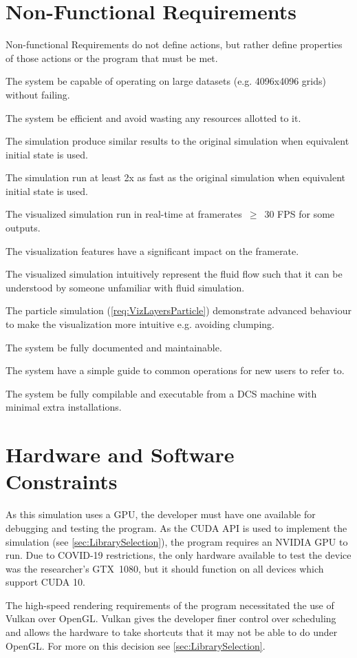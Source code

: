 \section{Non-Functional Requirements}
Non-functional Requirements do not define actions, but rather define properties of those actions or the program that must be met.
\begin{reqNF}
    \item \label{reqN:LargeData} The system \must{} be capable of operating on large datasets (e.g. 4096x4096 grids) without failing.
    \item \label{reqN:Resources} The system \must{} be efficient and avoid wasting any resources allotted to it.
    \item \label{reqN:SimilarOutput} The simulation \must{} produce similar results to the original simulation when equivalent initial state is used.
    \item \label{reqN:SimSpeed} The simulation \should{} run at least 2x as fast as the original simulation when equivalent initial state is used.
    \item \label{reqN:Realtime} The visualized simulation \must{} run in real-time at framerates~$\ge$~30 FPS for some outputs.
    \item \label{reqN:VizSpeed} The visualization features \shouldnt{} have a significant impact on the framerate.
    \item \label{reqN:Intuitive} The visualized simulation \should{} intuitively represent the fluid flow such that it can be understood by someone unfamiliar with fluid simulation.
    \item \label{reqN:VizParticleAdvanced} The particle simulation (\cref{req:VizLayersParticle}) \should{} demonstrate advanced behaviour to make the visualization more intuitive e.g. avoiding clumping.
    \item \label{reqN:Documented} The system \must{} be fully documented and maintainable. %
    \item \label{reqN:UsageGuide} The system \should{} have a simple guide to common operations for new users to refer to.
    \item \label{reqN:DCSCompile} The system \should{} be fully compilable and executable from a DCS machine with minimal extra installations.
\end{reqNF}

\section{Hardware and Software Constraints}
\label{sec:Requirements_HardwareSoftware}
As this simulation uses a GPU, the developer must have one available for debugging and testing the program.
As the CUDA API is used to implement the simulation (see \cref{sec:LibrarySelection}), the program requires an NVIDIA GPU to run.
Due to COVID-19 restrictions, the only hardware available to test the device was the researcher's GTX~1080, but it should function on all devices which support CUDA 10.

The high-speed rendering requirements of the program necessitated the use of Vulkan over OpenGL.
Vulkan gives the developer finer control over scheduling and allows the hardware to take shortcuts that it may not be able to do under OpenGL.
For more on this decision see \cref{sec:LibrarySelection}.